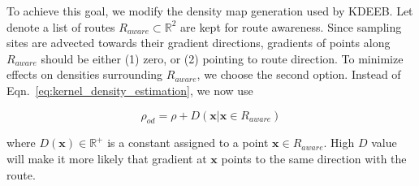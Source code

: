 To achieve this goal, we modify the density map generation used by KDEEB.
Let denote a list of routes $R_{aware} \subset \mathbb{R}^2$ are kept for route awareness.
Since sampling sites are advected towards their gradient directions, gradients of points along $R_{aware}$ should be either (1) zero, or (2) pointing to route direction.
To minimize effects on densities surrounding $R_{aware}$, we choose the second option.
Instead of Eqn.~\ref{eq:kernel_density_estimation}, we now use

\vspace{-7mm}
\begin{equation}\label{eq:new_density}
\rho_{od} = \rho + D(\textbf{x} | \textbf{x} \in R_{aware})
\end{equation}
\vspace{-1mm}

\noindent
where $D(\textbf{x}) \in \mathbb{R}^+$ is a constant assigned to a point $\textbf{x} \in R_{aware}$.
High $D$ value will make it more likely that gradient at $\textbf{x}$ points to the same direction with the route.
